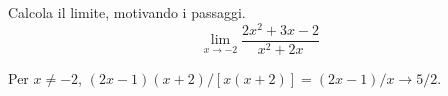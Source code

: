 
\begin{esercizio}
Calcola il limite, motivando i passaggi.
\[
        \lim_{x\to -2}
        \frac{2x^2+3x-2}{x^2+2x}
    \]
\end{esercizio}

\begin{soluzione}
Per $x\ne-2$, $(2x-1)(x+2)/[x(x+2)]=(2x-1)/x\to5/2$.
\end{soluzione}
